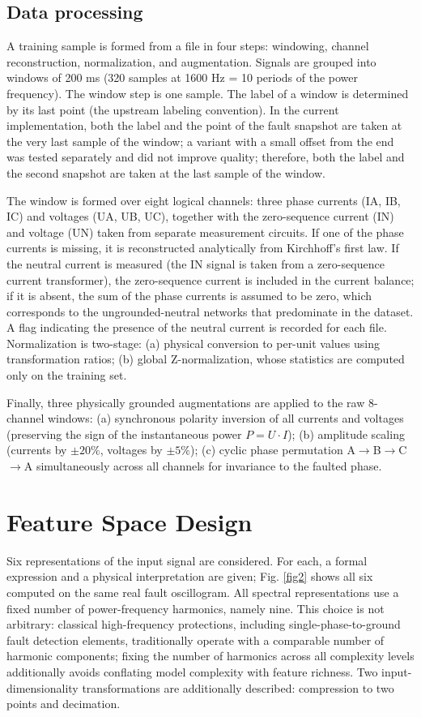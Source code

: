 \documentclass{ieeeojies}
\begin{document}
\subsection{Data processing}

A training sample is formed from a file in four steps: windowing, channel reconstruction, normalization, and augmentation. Signals are grouped into windows of 200 ms (320 samples at 1600 Hz = 10 periods of the power frequency). The window step is one sample. The label of a window is determined by its last point (the upstream labeling convention). In the current implementation, both the label and the point of the fault snapshot are taken at the very last sample of the window; a variant with a small offset from the end was tested separately and did not improve quality; therefore, both the label and the second snapshot are taken at the last sample of the window.

The window is formed over eight logical channels: three phase currents (IA, IB, IC) and voltages (UA, UB, UC), together with the zero-sequence current (IN) and voltage (UN) taken from separate measurement circuits. If one of the phase currents is missing, it is reconstructed analytically from Kirchhoff's first law. If the neutral current is measured (the IN signal is taken from a zero-sequence current transformer), the zero-sequence current is included in the current balance; if it is absent, the sum of the phase currents is assumed to be zero, which corresponds to the ungrounded-neutral networks that predominate in the dataset. A flag indicating the presence of the neutral current is recorded for each file. Normalization is two-stage: (a) physical conversion to per-unit values using transformation ratios; (b) global Z-normalization, whose statistics are computed only on the training set. 

Finally, three physically grounded augmentations are applied to the raw 8-channel windows: (a) synchronous polarity inversion of all currents and voltages (preserving the sign of the instantaneous power $P = U\cdot I$); (b) amplitude scaling (currents by $\pm 20\%$, voltages by $\pm 5\%$); (c) cyclic phase permutation A$\to$B$\to$C$\to$A simultaneously across all channels for invariance to the faulted phase.

\section{Feature Space Design}

Six representations of the input signal are considered. For each, a formal expression and a physical interpretation are given; Fig. \ref{fig2} shows all six computed on the same real fault oscillogram. All spectral representations use a fixed number of power-frequency harmonics, namely nine. This choice is not arbitrary: classical high-frequency protections, including single-phase-to-ground fault detection elements, traditionally operate with a comparable number of harmonic components; fixing the number of harmonics across all complexity levels additionally avoids conflating model complexity with feature richness. Two input-dimensionality transformations are additionally described: compression to two points and decimation.
\end{document}

